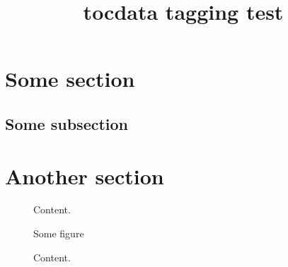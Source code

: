 \documentclass{article}
\title{tocdata tagging test}
\begin{document}
\tableofcontents

\listoffigures

\section{Some section}
\subsection{Some subsection}

\section{Another section}

\begin{figure}
Content.
\caption{Some figure}
\end{figure}

\begin{figure}
Content.
\end{figure}
\end{document}
